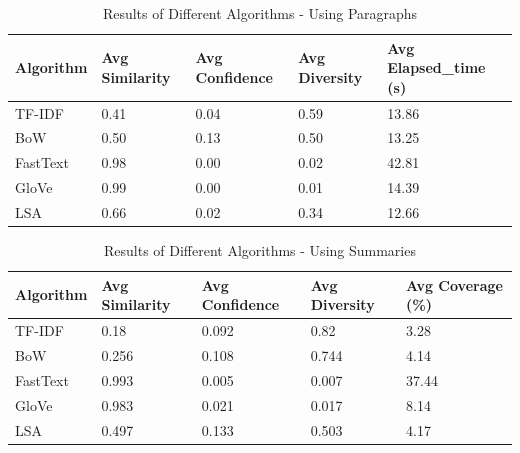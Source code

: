 \documentclass{llncs}
\begin{document}
\begin{table}
\caption{Results of Different Algorithms - Using Paragraphs}\label{tab1}
\centering
\begin{tabular}{|l|l|l|l|l|}
\hline
\textbf{Algorithm} & \textbf{Avg Similarity} & \textbf{Avg Confidence} & \textbf{Avg Diversity} &  \textbf{Avg Elapsed\_time (s)} \\ 
\hline
TF-IDF      & 0.41  & 0.04  & 0.59  & 13.86  \\ \hline
BoW         & 0.50  & 0.13  & 0.50  & 13.25  \\ \hline
FastText    & 0.98  & 0.00  & 0.02  & 42.81 \\ \hline
GloVe       & 0.99  & 0.00  & 0.01  & 14.39 \\ \hline
LSA         & 0.66  & 0.02  & 0.34  & 12.66   \\ \hline

\end{tabular}
\end{table}

\begin{table}
\caption{Results of Different Algorithms - Using Summaries}\label{tab2}
\centering
\begin{tabular}{|l|l|l|l|l|}
\hline

\textbf{Algorithm} & \textbf{Avg Similarity} & \textbf{Avg Confidence} & \textbf{Avg Diversity} & \textbf{Avg Coverage (\%)} \\ 
\hline
TF-IDF    & 0.18                    & 0.092               & 0.82                & 3.28 \\ \hline
BoW                 & 0.256                   & 0.108               & 0.744               & 4.14 \\ \hline
FastText            & 0.993                   & 0.005               & 0.007               & 37.44 \\ \hline
GloVe               & 0.983                   & 0.021               & 0.017               & 8.14 \\ \hline
LSA                 & 0.497                   & 0.133               & 0.503               & 4.17 \\ \hline


\end{tabular}

\end{table}
\end{document}
